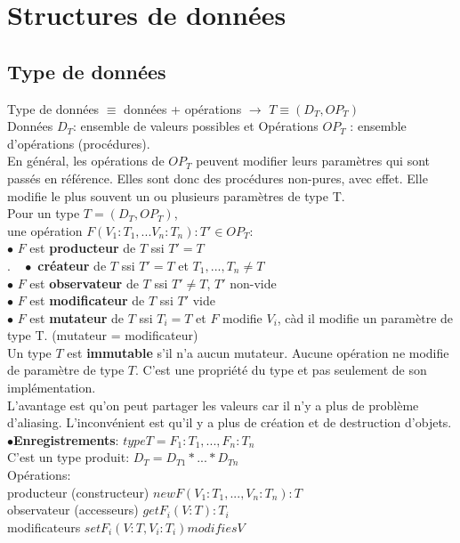 \section{Structures de données}
\subsection{Type de données}
Type de données $\equiv$ données + opérations $\rightarrow$ $T\equiv(D_T, OP_T)$\\
Données $D_T$: ensemble de valeurs possibles et Opérations $OP_T$ : ensemble d'opérations (procédures).\\
En général, les opérations de $OP_T$ peuvent modifier leurs paramètres qui sont passés en référence. Elles sont donc des procédures non-pures, avec effet. Elle modifie le plus souvent un ou plusieurs paramètres de type T.\\

Pour un type $T=(D_T, OP_T)$,\\ une opération $F(V_1:T_1,...V_n:T_n) : T' \in OP_T$:\\
$\bullet$ $F$ est \textbf{producteur} de $T$ ssi $T'=T$ \\
$.\quad \bullet$ \textbf{créateur} de $T$ ssi $T' =T$ et $T_1,...,T_n \neq T$\\
$\bullet$ $F$ est \textbf{observateur} de $T$ ssi $T'\neq T$, $T'$ non-vide \\
$\bullet$ $F$ est \textbf{modificateur} de $T$ ssi $T'$ vide \\
$\bullet$ $F$ est \textbf{mutateur} de $T$ ssi $T_i = T$ et $F$ modifie $V_i$, càd il modifie un paramètre de type T. (mutateur = modificateur)  \\

Un type $T$ est \textbf{immutable} s'il n'a aucun mutateur. Aucune opération ne modifie de paramètre de type $T$. C'est une propriété du type et pas seulement de son implémentation.\\
L'avantage est qu'on peut partager les valeurs car il n'y a plus de problème d'aliasing. L'inconvénient est qu'il y a plus de création et de destruction d'objets.\\

$\bullet$\textbf{Enregistrements}: $type T = {F_1:T_1,...,F_n:T_n}$\\
C'est un type produit: $D_T = D_{T1}*...*D_{Tn}$\\
Opérations:\\
producteur (constructeur) $newF(V_1:T_1,...,V_n:T_n):T$\\
observateur (accesseurs) $getF_i(V:T):T_i$\\
modificateurs $setF_i (V:T,V_i:T_i) modifies V$\\

